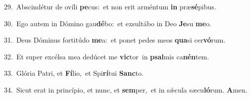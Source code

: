 {\numbfont\textcolor{\numbcolor}{29.}}~Abscindétur de ovíli \textbf{pe}\-cus:~\star et non erit arméntum \textbf{in} præ\-\textbf{sé}\-pibus.\par
{\numbfont\textcolor{\numbcolor}{30.}}~Ego autem in Dómino gau\-\textbf{dé}\-bo:~\star et exsultábo in Deo \textbf{Je}\-su \textbf{me}\-o.\par
{\numbfont\textcolor{\numbcolor}{31.}}~Deus Dóminus fortitúdo \textbf{me}\-a:~\star et ponet pedes meos \textbf{qua}\-si cer\-\textbf{vó}\-rum.\par
{\numbfont\textcolor{\numbcolor}{32.}}~Et super excélsa mea dedúcet me \textbf{vic}\-tor~\star in \textbf{psal}\-mis ca\-\textbf{nén}\-tem.\par
{\numbfont\textcolor{\numbcolor}{33.}}~Glória Patri, et \textbf{Fí}\-lio,~\star et Spi\-\textbf{rí}\-tui \textbf{Sanc}\-to.\par
{\numbfont\textcolor{\numbcolor}{34.}}~Sicut erat in princípio, et nunc, et \textbf{sem}\-per,~\star et in sǽcula sæcu\-\textbf{ló}\-rum. \textbf{A}\-men.\par
